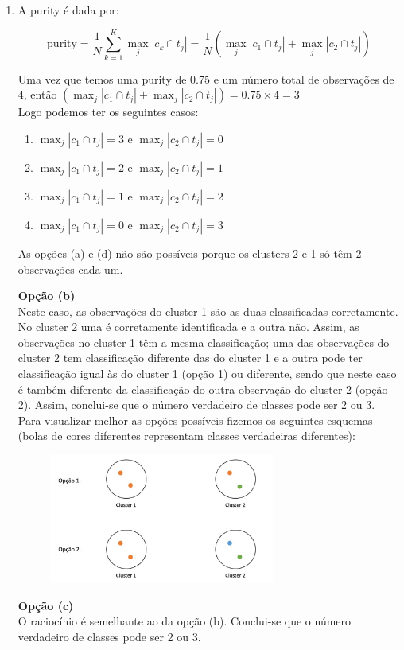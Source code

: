 \documentclass[a4paper,12pt]{article} %
\begin{document}
\begin{enumerate}
\item

A purity é dada por:

\begin{equation}
    \text{purity} = \frac{1}{N} \sum_{k=1}^K \max_j |c_k \cap t_j| = \frac{1}{N} \left( \max_j |c_1 \cap t_j| + \max_j |c_2 \cap t_j| \right)
\end{equation}


Uma vez que temos uma purity de 0.75 e um número total de observações de 4,
então $\left( \max_j |c_1 \cap t_j| + \max_j |c_2 \cap t_j| \right) = 0.75 \times 4 = 3$ \\ 

Logo podemos ter os seguintes casos:
\begin{enumerate}
    \item $\max_j |c_1 \cap t_j| = 3$ e $\max_j |c_2 \cap t_j| = 0$
    \item $\max_j |c_1 \cap t_j| = 2$ e $\max_j |c_2 \cap t_j| = 1$
    \item $\max_j |c_1 \cap t_j| = 1$ e $\max_j |c_2 \cap t_j| = 2$
    \item $\max_j |c_1 \cap t_j| = 0$ e $\max_j |c_2 \cap t_j| = 3$
\end{enumerate}

As opções (a) e (d) não são possíveis porque os clusters 2 e 1 só têm 2 observações cada um. 

\textbf{Opção (b)} \\ 
Neste caso, as observações do cluster 1 são as duas classificadas corretamente. 
No cluster 2 uma é corretamente identificada e a outra não. Assim, as observações 
no cluster 1 têm a mesma classificação; uma das observações do cluster 2 tem classificação
diferente das do cluster 1 e a outra pode ter classificação igual às do cluster 1 (opção 1)
ou diferente, sendo que neste caso é também diferente da classificação do outra observação
do cluster 2 (opção 2). Assim, conclui-se que o número verdadeiro de classes pode ser 2 ou 3. \\
Para visualizar melhor as opções possíveis fizemos os seguintes esquemas 
(bolas de cores diferentes representam classes verdadeiras diferentes):

\begin{figure}[H]
\centering
\includegraphics[width=0.7\textwidth]{ex4_clusters.jpg}
\end{figure}

\textbf{Opção (c)} \\
O raciocínio é semelhante ao da opção (b). Conclui-se que o número verdadeiro de classes pode ser 2 ou 3.

\end{enumerate}
\end{document}
